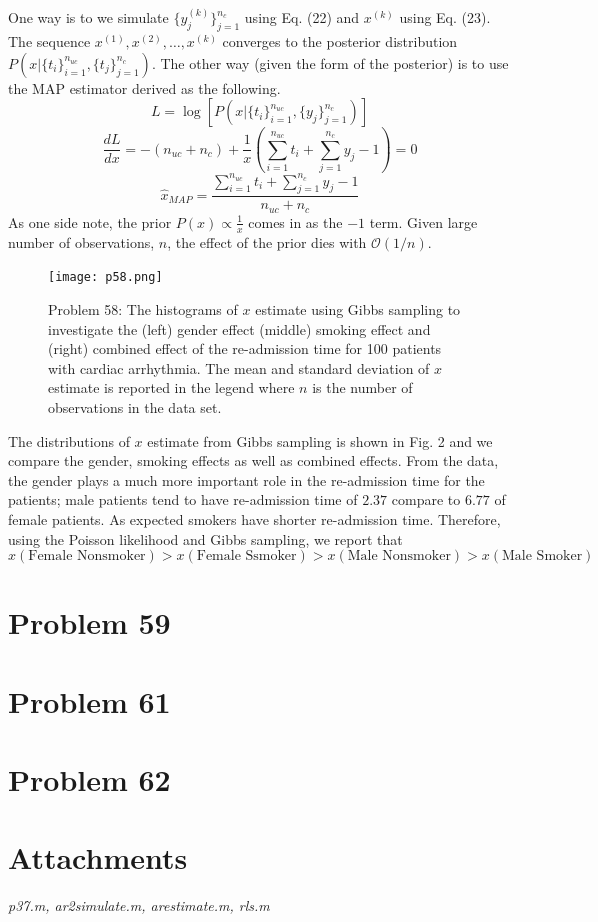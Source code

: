 \documentclass[a4paper, 11pt]{article}
\begin{document}
One way is to we simulate $\{y_j^{(k)} \}_{j=1}^{n_c}$ using Eq. (22) and $x^{(k)}$ using Eq. (23). The sequence $x^{(1)}, x^{(2)}, \dots, x^{(k)}$ converges to the posterior distribution $P(x|\{t_i\}_{i=1}^{n_{uc}}, \{t_j\}_{j=1}^{n_{c}})$. The other way (given the form of the posterior) is to use the MAP estimator derived as the following. 
\begin{equation}
L = \log \left[P\left( x| \{t_i\}_{i=1}^{n_{uc}}, \{y_j\}_{j=1}^{n_{c}} \right)\right]
\end{equation}
\begin{equation}
\frac{dL}{dx} = -(n_{uc}+n_c) + \frac{1}{x}\left(\sum_{i=1}^{n_{uc}}t_i + \sum_{j=1}^{n_c}y_j - 1 \right) = 0
\end{equation}
\begin{equation}
\hat{x}_{MAP} = \frac{\sum_{i=1}^{n_{uc}}t_i + \sum_{j=1}^{n_c}y_j - 1}{n_{uc}+n_c}
\end{equation}
As one side note, the prior $P(x) \propto \frac{1}{x}$ comes in as the $-1$ term. Given large number of observations, $n$, the effect of the prior dies with $\mathcal{O}(1/n)$.

\begin{figure}
	\begin{center}
		\texttt{[image: p58.png]}
		\caption{Problem 58: The histograms of $x$ estimate using Gibbs sampling to investigate the (left) gender effect (middle) smoking effect and (right) combined effect of the re-admission time for 100 patients with cardiac arrhythmia. The mean and standard deviation of $x$ estimate is reported in the legend where $n$ is the number of observations in the data set. } 
	\end{center}
\end{figure}

The distributions of $x$ estimate from Gibbs sampling is shown in Fig. 2 and we compare the gender, smoking effects as well as combined effects. From the data, the gender plays a much more important role in the re-admission time for the patients; male patients tend to have re-admission time of $2.37$ compare to $6.77$ of female patients. As expected smokers have shorter re-admission time. Therefore, using the Poisson likelihood and Gibbs sampling, we report that
\begin{equation}
x(\text{Female Nonsmoker}) > x(\text{Female Ssmoker}) > x(\text{Male Nonsmoker}) > x(\text{Male Smoker})
\end{equation}



\section*{Problem 59}





\section*{Problem 61}




\section*{Problem 62}




\section*{Attachments}
\textit{p37.m, ar2simulate.m, arestimate.m, rls.m}
\end{document}
